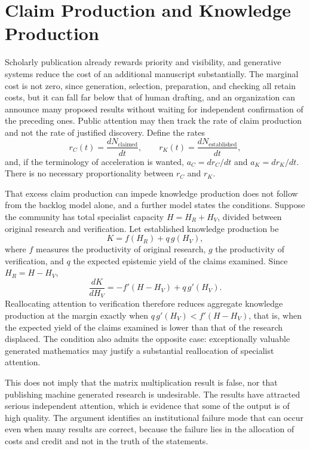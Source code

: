 \documentclass[12pt]{article}
\begin{document}
\section{Claim Production and Knowledge Production}

Scholarly publication already rewards priority and visibility, and generative systems reduce the cost of an additional manuscript substantially. The marginal cost is not zero, since generation, selection, preparation, and checking all retain costs, but it can fall far below that of human drafting, and an organization can announce many proposed results without waiting for independent confirmation of the preceding ones. Public attention may then track the rate of claim production and not the rate of justified discovery. Define the rates
\begin{equation}
r_C(t)=\frac{dN_{\mathrm{claimed}}}{dt}, \qquad r_K(t)=\frac{dN_{\mathrm{established}}}{dt},
\end{equation}
and, if the terminology of acceleration is wanted, $a_C=dr_C/dt$ and $a_K=dr_K/dt$. There is no necessary proportionality between $r_C$ and $r_K$.

That excess claim production can impede knowledge production does not follow from the backlog model alone, and a further model states the conditions. Suppose the community has total specialist capacity $H=H_R+H_V$, divided between original research and verification. Let established knowledge production be
\begin{equation}
K=f(H_R)+q\,g(H_V),
\end{equation}
where $f$ measures the productivity of original research, $g$ the productivity of verification, and $q$ the expected epistemic yield of the claims examined. Since $H_R=H-H_V$,
\begin{equation}
\frac{dK}{dH_V}=-f'(H-H_V)+q\,g'(H_V).
\end{equation}
Reallocating attention to verification therefore reduces aggregate knowledge production at the margin exactly when $q\,g'(H_V)<f'(H-H_V)$, that is, when the expected yield of the claims examined is lower than that of the research displaced. The condition also admits the opposite case: exceptionally valuable generated mathematics may justify a substantial reallocation of specialist attention.

This does not imply that the matrix multiplication result is false, nor that publishing machine generated research is undesirable. The results have attracted serious independent attention, which is evidence that some of the output is of high quality. The argument identifies an institutional failure mode that can occur even when many results are correct, because the failure lies in the allocation of costs and credit and not in the truth of the statements.
\end{document}
